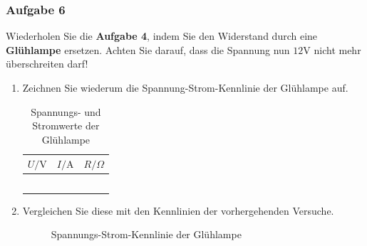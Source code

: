 \subsubsection{Aufgabe 6}
Wiederholen Sie die \textbf{Aufgabe 4}, indem Sie den Widerstand durch eine \textbf{Glühlampe} ersetzen. Achten Sie darauf, dass die Spannung nun $12\text{V}$ nicht mehr überschreiten darf!
\begin{enumerate}[$a)$] 
\item Zeichnen Sie wiederum die Spannung-Strom-Kennlinie der Glühlampe auf. 
\begin{table}[H]
\centering
\begin{tabular}{ccc}\hline
$U/\text{V}$&$I/\text{A}$&$R/\Omega$\\\hline
&&\\
&&\\
&&\\
&&\\
&&\\\hline
\end{tabular}
\caption{Spannungs- und Stromwerte der Glühlampe}
\end{table}
\item Vergleichen Sie diese mit den Kennlinien der vorhergehenden Versuche.
\begin{figure}[H]
\centering
{}
\caption{Spannungs-Strom-Kennlinie der Glühlampe}
\end{figure}
\end{enumerate}
